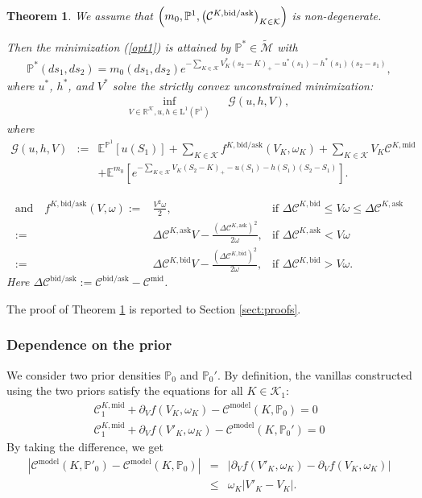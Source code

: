 \documentclass{amsart}%
\def \P{{\mathbb P}}
\def\Cc{{\cal C}}
\def\Gc{{\cal G}}
\def\Kc{{\cal K}}
\def\no{\noindent}
\newtheorem{thm}{Theorem}[section]
\theoremstyle{definition}
\theoremstyle{remark}
\newcommand{\PP}{\mathbb{P}}
\newcommand{\beaa}{\begin{eqnarray*}}
\newcommand{\eeaa}{\end{eqnarray*}}
\newcommand{\EE}{{\mathbb E}}
\newcommand{\RR}{{\mathbb R}}
\newcommand{\cal}{\mathcal}
\newcommand{\LL}{{\mathrm L}}
\begin{document}
\begin{thm}\label{thm:minimG_elem_M}
We assume that $\left(m_0, \P^1, \left(\Cc^{K,{\rm bid/ask}}\right)_{K\in\Kc}\right)$ is non-degenerate.

\no Then the minimization (\ref{opt1}) is attained by $\PP^* \in \widetilde{\cal M}$ with
\beaa
\PP^*(ds_1,ds_2)={m_0}(ds_1,ds_2) e^{- \sum_{K \in {\cal K}} V_K^* (s_{2}-K)_+-u^*(s_1) -h^*(s_1)(s_2-s_1)  },
\eeaa
where $u^*$, $h^*$, and $  V^*$ solve the strictly convex unconstrained minimization:
 \beaa
 \inf_{V \in \RR^{{\cal K}}, u, h \in \LL^1(\PP^1)}&& \Gc(u,h,V),
 \eeaa
 where
\beaa
\Gc(u,h,V) &:=& \EE^{\PP^1}[u(S_1)]+\sum_{K \in {\cal K}}f^{K,\mathrm{bid}/\mathrm{ask}}(V_K,\omega_K)+\sum_{K \in {\cal K}}  V_K \Cc^{K,\mathrm{mid}} \\
&&+\EE^{{m_0}}\left[  e^{- \sum_{K \in {\cal K}} V_K (S_{2}-K)_+ -u(S_1)-h(S_1)(S_2-S_1)  }\right].
\eeaa

\beaa
\mbox{and}\quad f^{K,\mathrm{bid}/\mathrm{ask}}(V,\omega):=&\frac{V^2 \omega }{2}, &\mbox{if }  \Delta \Cc^{K,\mathrm{bid}}\leq V \omega \leq  \Delta \Cc^{K,\mathrm{ask}} \\
 :=&\Delta \Cc^{K,\mathrm{ask}} V -\frac{(\Delta \Cc^{K,\mathrm{ask}})^2 }{2 \omega}
 , &\mbox{if }  \Delta \Cc^{K,\mathrm{ask}}< V \omega \\
 :=& \Delta \Cc^{K,\mathrm{bid}} V -\frac{(\Delta \Cc^{K,\mathrm{bid}})^2 }{2 \omega}
 , &\mbox{if }   \Delta \Cc^{K,\mathrm{bid}}> V \omega.
\eeaa
Here $ \Delta {\cal C}^{\mathrm{bid}/\mathrm{ask}}:= {\cal C}^{\mathrm{bid}/\mathrm{ask}}-{\cal C}^\mathrm{mid}$. 
\end{thm}

\no The proof of Theorem \ref{thm:minimG_elem_M} is reported to Section \ref{sect:proofs}.


\subsubsection{Dependence on the prior}

\no We consider two prior densities $\PP_0$ and $\PP_0'$. By definition, the vanillas constructed using the two priors satisfy the equations for all $K \in {\cal K}_1$:
\beaa \Cc^{K,\mathrm{mid}}_1+\partial_Vf(V_K,\omega_K)- {\cal C}^\mathrm{model}(K,\PP_0)=0 \\
\Cc^{K,\mathrm{mid}}_1+\partial_V f(V'_K,\omega_K)- {\cal C}^\mathrm{model}(K,\PP_0')=0
\eeaa By taking the difference, we get
\beaa
|{\cal C}^\mathrm{model}(K,\PP'_0)-{\cal C}^\mathrm{model}(K,\PP_0)|&=&|\partial_V f(V'_K,\omega_K)-\partial_V f(V_K,\omega_K)| \\
&\leq& \omega_K |V'_K-V_K|.
\eeaa
\end{document}
